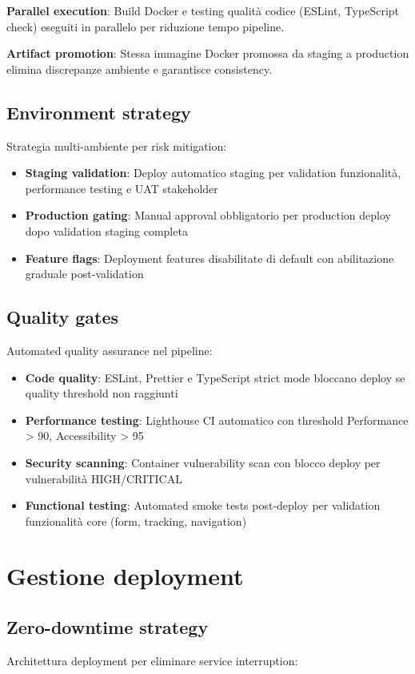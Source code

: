 \textbf{Parallel execution}: Build Docker e testing qualità codice (ESLint, 
TypeScript check) eseguiti in parallelo per riduzione tempo pipeline.

\textbf{Artifact promotion}: Stessa immagine Docker promossa da staging a 
production elimina discrepanze ambiente e garantisce consistency.

\subsection{Environment strategy}
Strategia multi-ambiente per risk mitigation:
\begin{itemize}
  \item \textbf{Staging validation}: Deploy automatico staging per validation 
  funzionalità, performance testing e UAT stakeholder
  \item \textbf{Production gating}: Manual approval obbligatorio per production 
  deploy dopo validation staging completa
  \item \textbf{Feature flags}: Deployment features disabilitate di default 
  con abilitazione graduale post-validation
\end{itemize}

\subsection{Quality gates}
Automated quality assurance nel pipeline:
\begin{itemize}
  \item \textbf{Code quality}: ESLint, Prettier e TypeScript strict mode 
  bloccano deploy se quality threshold non raggiunti
  \item \textbf{Performance testing}: Lighthouse CI automatico con threshold 
  Performance > 90, Accessibility > 95
  \item \textbf{Security scanning}: Container vulnerability scan con blocco 
  deploy per vulnerabilità HIGH/CRITICAL
  \item \textbf{Functional testing}: Automated smoke tests post-deploy per 
  validation funzionalità core (form, tracking, navigation)
\end{itemize}

\section{Gestione deployment}

\subsection{Zero-downtime strategy}
Architettura deployment per eliminare service interruption:

